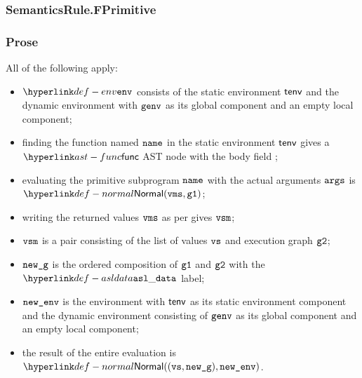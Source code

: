 \begin{mathpar}
\end{mathpar}

\subsubsection{SemanticsRule.FPrimitive \label{sec:SemanticsRule.FPrimitive}}
\subsubsection{Prose}
All of the following apply:
\begin{itemize}
  \item $\env$ consists of the static environment $\tenv$ and the dynamic environment with $\genv$ as its
        global component and an empty local component;
  \item finding the function named $\name$ in the static environment $\tenv$ gives a $\func$ AST node
        with the body field \SBPrimitive;
  \item evaluating the primitive subprogram $\name$ with the actual arguments $\args$
        is $\Normal(\vms, \vgone)$\ProseOrError;
  \item writing the returned values $\vms$ as per  gives $\vvsm$;
  \item $\vvsm$ is a pair consisting of the list of values $\vvs$ and execution graph $\vgtwo$;
  \item $\newg$ is the ordered composition of $\vgone$ and $\vgtwo$ with the $\asldata$ label;
  \item $\newenv$ is the environment with $\tenv$ as its static environment component
        and the dynamic environment consisting of $\genv$ as its global component and an empty local component;
  \item the result of the entire evaluation is $\Normal((\vvs, \newg), \newenv)$.
\end{itemize}

